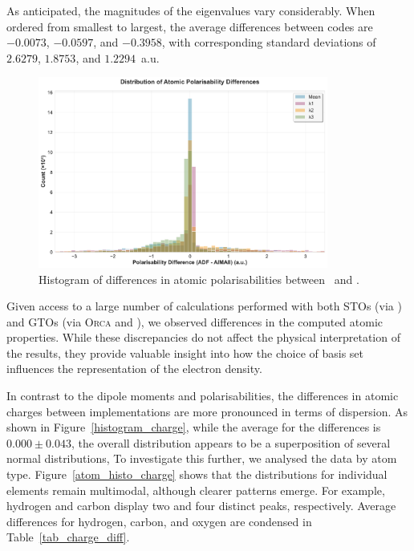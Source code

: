 As anticipated, the magnitudes of the eigenvalues vary considerably. 
When ordered from smallest to largest, the average differences between 
codes are $-0.0073$, $-0.0597$, and $-0.3958$, with corresponding 
standard deviations of $2.6279$, $1.8753$, and $1.2294$~a.u.

\begin{figure}[h]
  \centering
  \includegraphics[width=0.85\textwidth]{img/histogram_polarisability.pdf}
  \caption{Histogram of differences in atomic polarisabilities between \adf\ and
    \aimall.}
  \label{histogram_pol}
\end{figure}

\newpage
Given access to a large number of calculations performed with both
\glspl{STO} (via \adf) and \glspl{GTO} (via \textsc{Orca} and \aimall), we observed
differences in the computed atomic properties. While
these discrepancies do not affect the physical interpretation of the results,
they provide valuable insight into how the choice of basis set influences the
representation of the electron density.

In contrast to the dipole moments and polarisabilities, the differences in
atomic charges between implementations are more pronounced in terms of
dispersion. As shown in Figure~\ref{histogram_charge}, while the average for
the differences is $0.000 \pm 0.043$, the overall distribution appears to be a
superposition of several normal distributions, To investigate this further, we
analysed the data by atom type. Figure~\ref{atom_histo_charge} shows that the
distributions for individual elements remain multimodal, although clearer
patterns emerge. For example, hydrogen and carbon display two and four distinct
peaks, respectively. Average differences for hydrogen, carbon, and oxygen
are condensed in Table~\ref{tab_charge_diff}.

